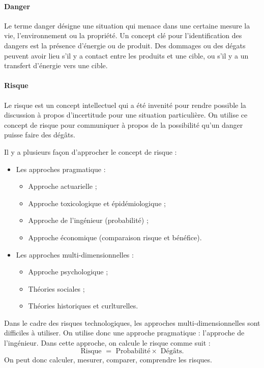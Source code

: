 \paragraph{Danger} Le terme danger désigne une situation
qui menace dans une certaine mesure la vie, l'environnement
ou la propriété.
Un concept clé pour l'identification des dangers est la
présence d'énergie ou de produit. Des dommages ou des dégats
peuvent avoir lieu s'il y a contact entre les produits
et une cible, ou s'il y a un transfert d'énergie vers une cible.
\paragraph{Risque} Le risque est un concept intellectuel qui
a été invenité pour rendre possible la discussion à propos
d'incertitude pour une situation particulière. On utilise
ce concept de risque pour communiquer à propos de la
possibilité qu'un danger puisse faire des dégâts.

Il y a plusieurs façon d'approcher le concept de risque :
\begin{itemize}
	\item Les approches pragmatique :
	\begin{itemize}
		\item Approche actuarielle ;
		\item Approche toxicologique et épidémiologique ;
		\item Approche de l'ingénieur (probabilité) ;
		\item Approche économique (comparaison risque et
		bénéfice).
	\end{itemize}
	\item Les approches multi-dimensionnelles :
	\begin{itemize}
		\item Approche psychologique ;
		\item Théories sociales ;
		\item Théories historiques et curlturelles.
	\end{itemize}
\end{itemize}

Dans le cadre des risques technologiques, les approches
multi-dimensionnelles sont difficiles à utiliser. On
utilise donc une approche pragmatique : l'approche
de l'ingénieur. Dans cette approche, on calcule le risque
comme suit :
\[ \text{Risque } = \text{ Probabilité} \times \text{ Dégâts}. \]
On peut donc calculer, mesurer, comparer, comprendre les
risques.

